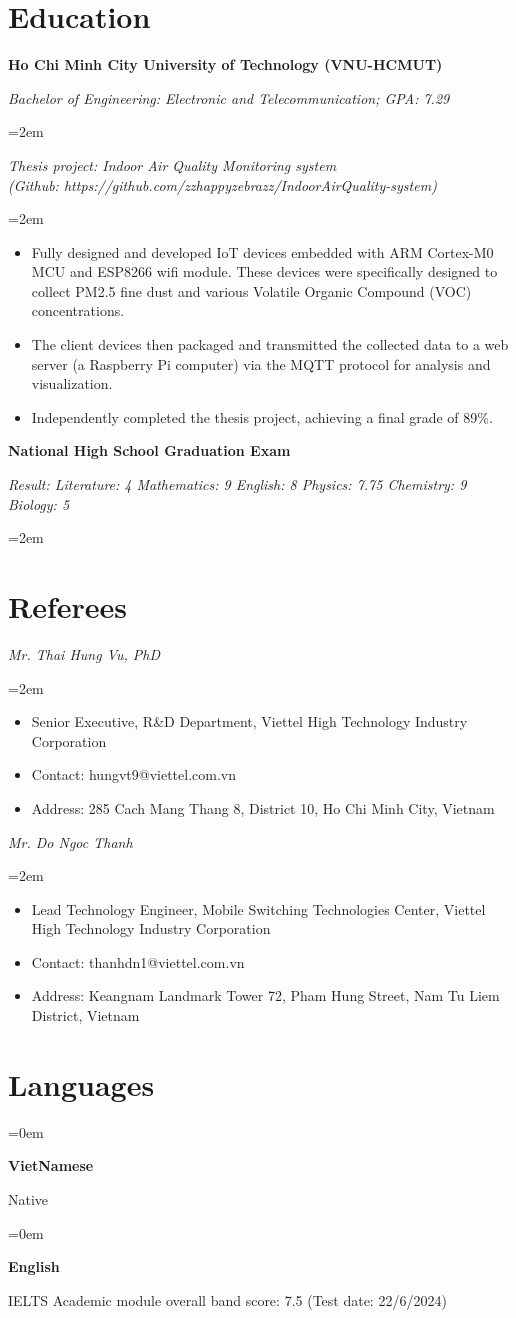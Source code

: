 \documentclass[10pt]{article}
\newlength{\spacebox}
\newcommand{\lan}[2]{
    \noindent\hangindent=0em\hangafter=0
    \parbox{3\spacebox}{%
        \textbf{#1}} %
     #2 \par}    %
\newcommand{\education}[4]{

  \noindent  \textbf{#1}
    \hfill 
    \framebox{%
    \parbox{9em}{%
    \centering\textbf{#2}}} \par
     \noindent \textit{#3} \par
     \vspace*{0.5em}
     \noindent\hangindent=2em\hangafter=0 \small #4 
\normalsize \par}
\newcommand{\project}[3]{
  \noindent \textbf{#1} \par
  \noindent \textit{#2} \par
  \vspace*{0.5em}
  \noindent\hangindent=2em\hangafter=0 \small #3
  \normalsize \par
}
\begin{document}
\section*{Education}
\education{Ho Chi Minh City University of Technology (VNU-HCMUT)}
{Aug 2017--Nov 2021}
{Bachelor of Engineering: Electronic and Telecommunication; GPA: 7.29}
{}
\project{}
{Thesis project: Indoor Air Quality Monitoring system \\(Github: https://github.com/zzhappyzebrazz/IndoorAirQuality-system)}
{
  \begin{itemize}
    \item Fully designed and developed IoT devices embedded with ARM Cortex-M0 MCU and ESP8266 wifi module.
     These devices were specifically designed to collect PM2.5 fine dust and various Volatile Organic Compound (VOC) concentrations.
     \item The client devices then packaged and transmitted the collected data to a web server (a Raspberry Pi computer) via the MQTT protocol for analysis and visualization.
     \item Independently completed the thesis project, achieving a final grade of 89\%.
  \end{itemize}
}
\education{National High School Graduation Exam}
{July 2017}
{Result: Literature: 4 Mathematics: 9 English: 8 Physics: 7.75 Chemistry: 9 Biology: 5}
{}

\section*{Referees}
\project{}
{Mr. Thai Hung Vu, PhD}
{
  \begin{itemize}
    \item Senior Executive, R\&D Department, Viettel High Technology Industry Corporation
     \item Contact: hungvt9@viettel.com.vn
     \item Address: 285 Cach Mang Thang 8, District 10, Ho Chi Minh City, Vietnam
  \end{itemize}
}
\project{}
{Mr. Do Ngoc Thanh}
{
  \begin{itemize}
    \item Lead Technology Engineer, Mobile Switching Technologies Center, Viettel High Technology Industry Corporation
     \item Contact: thanhdn1@viettel.com.vn
     \item Address: Keangnam Landmark Tower 72, Pham Hung Street, Nam Tu Liem District, Vietnam
  \end{itemize}
}
\section*{Languages}
\lan{VietNamese}{Native}
\lan{English}{IELTS Academic module overall band score: 7.5 (Test date: 22/6/2024)

\hspace{0.2cm}}
\end{document}

